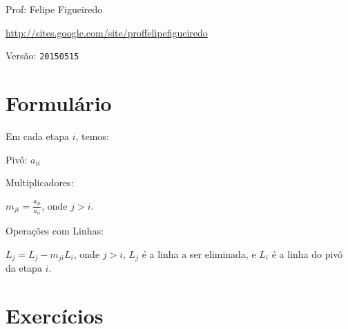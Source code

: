 \documentclass[a4paper]{article}
\begin{document}
\parbox[c]{.825\textwidth}{\raggedright%
{Prof: Felipe Figueiredo\par}
{\url{http://sites.google.com/site/proffelipefigueiredo}\par}
}

Versão: \verb|20150515|



\section{Formulário}

Em cada etapa $i$, temos:

Pivô: $a_{ii}$

Multiplicadores:

$m_{ji} = \frac{a_{ji}}{a_{ii}}$, onde $j>i$.

Operações com Linhas:

$L_j = L_j - m_{ji}L_i$, onde $j>i$, $L_j$ é a linha a ser eliminada,
e $L_i$ é a linha do pivô da etapa $i$.

\section{Exercícios}
\end{document}
